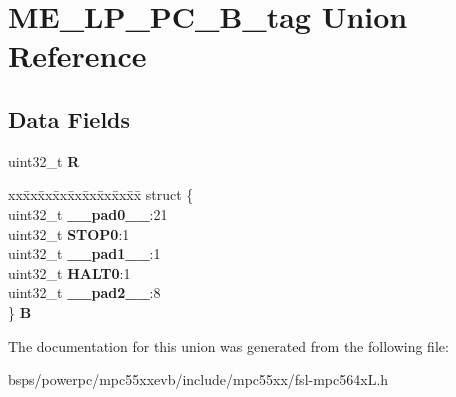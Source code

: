 \hypertarget{unionME__LP__PC__32B__tag}{}\section{M\+E\+\_\+\+L\+P\+\_\+\+P\+C\+\_\+B\+\_\+tag Union Reference}
\label{unionME__LP__PC__32B__tag}
\subsection*{Data Fields}
\begin{DoxyCompactItemize}
\item 
\mbox{\label{unionME__LP__PC__32B__tag_a48371a9f4233b75e0bf00974250e2810}} 
uint32\+\_\+t {\bfseries R}
\item 
\mbox{\label{unionME__LP__PC__32B__tag_a8281506681c724548299e401d3a7e7af}} 
\begin{tabbing}
xx\=xx\=xx\=xx\=xx\=xx\=xx\=xx\=xx\=\kill
struct \{\\
\>uint32\_t {\bfseries \_\_pad0\_\_}:21\\
\>uint32\_t {\bfseries STOP0}:1\\
\>uint32\_t {\bfseries \_\_pad1\_\_}:1\\
\>uint32\_t {\bfseries HALT0}:1\\
\>uint32\_t {\bfseries \_\_pad2\_\_}:8\\
\} {\bfseries B}\\

\end{tabbing}\end{DoxyCompactItemize}


The documentation for this union was generated from the following file\+:\begin{DoxyCompactItemize}
\item 
bsps/powerpc/mpc55xxevb/include/mpc55xx/fsl-\/mpc564x\+L.\+h\end{DoxyCompactItemize}
